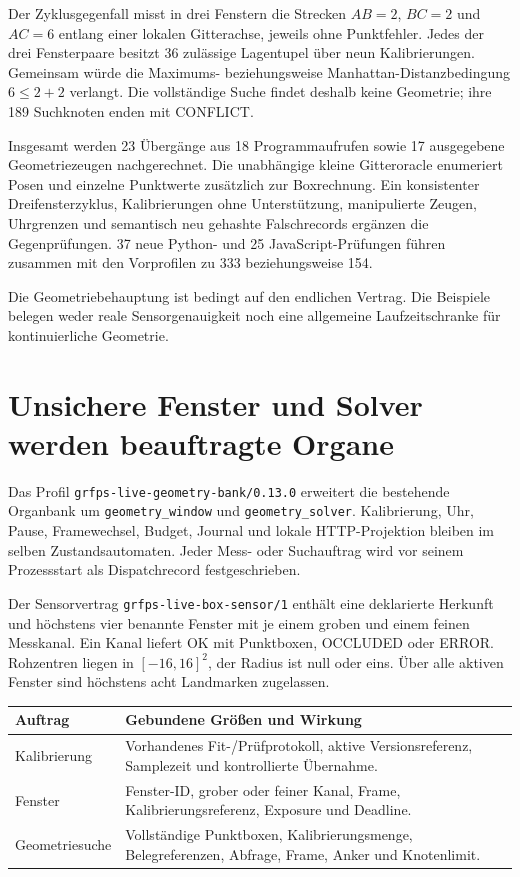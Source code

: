 \documentclass[11pt,a4paper]{article}
\newcommand{\nextsection}[2]{\clearpage{\color{accent}\small\textsf{#1}}\section{#2}}
\begin{document}
Der Zyklusgegenfall misst in drei Fenstern die Strecken $AB=2$,
$BC=2$ und $AC=6$ entlang einer lokalen Gitterachse, jeweils ohne
Punktfehler. Jedes der drei Fensterpaare besitzt 36 zulässige
Lagentupel über neun Kalibrierungen. Gemeinsam würde die
Maximums- beziehungsweise Manhattan-Distanzbedingung
$6\le2+2$ verlangt. Die vollständige Suche findet deshalb keine
Geometrie; ihre 189 Suchknoten enden mit CONFLICT.

Insgesamt werden 23 Übergänge aus 18 Programmaufrufen sowie
17 ausgegebene Geometriezeugen nachgerechnet. Die unabhängige
kleine Gitteroracle enumeriert Posen und einzelne Punktwerte
zusätzlich zur Boxrechnung. Ein konsistenter Dreifensterzyklus,
Kalibrierungen ohne Unterstützung, manipulierte Zeugen,
Uhrgrenzen und semantisch neu gehashte Falschrecords ergänzen
die Gegenprüfungen. 37 neue Python- und 25 JavaScript-Prüfungen
führen zusammen mit den Vorprofilen zu 333 beziehungsweise 154.

Die Geometriebehauptung ist bedingt auf den endlichen Vertrag.
Die Beispiele belegen weder reale Sensorgenauigkeit noch eine
allgemeine Laufzeitschranke für kontinuierliche Geometrie.

\nextsection{71 / LIVE-VERTRAG}{Unsichere Fenster und Solver werden beauftragte Organe}
Das Profil \texttt{grfps-live-geometry-bank/0.13.0} erweitert die
bestehende Organbank um \texttt{geometry\_window} und
\texttt{geometry\_solver}. Kalibrierung, Uhr, Pause, Framewechsel,
Budget, Journal und lokale HTTP-Projektion bleiben im selben
Zustandsautomaten. Jeder Mess- oder Suchauftrag wird vor seinem
Prozessstart als Dispatchrecord festgeschrieben.

Der Sensorvertrag \texttt{grfps-live-box-sensor/1} enthält eine
deklarierte Herkunft und höchstens vier benannte Fenster mit
je einem groben und einem feinen Messkanal. Ein Kanal liefert
OK mit Punktboxen, OCCLUDED oder ERROR. Rohzentren liegen in
$[-16,16]^2$, der Radius ist null oder eins. Über alle aktiven
Fenster sind höchstens acht Landmarken zugelassen.

\begin{tabularx}{\linewidth}{@{}lY@{}}\toprule
Auftrag & Gebundene Größen und Wirkung\\\midrule
Kalibrierung & Vorhandenes Fit-/Prüfprotokoll, aktive Versionsreferenz,
 Samplezeit und kontrollierte Übernahme.\\
Fenster & Fenster-ID, grober oder feiner Kanal, Frame,
 Kalibrierungsreferenz, Exposure und Deadline.\\
Geometriesuche & Vollständige Punktboxen, Kalibrierungsmenge,
 Belegreferenzen, Abfrage, Frame, Anker und Knotenlimit.\\\bottomrule
\end{tabularx}
\end{document}
